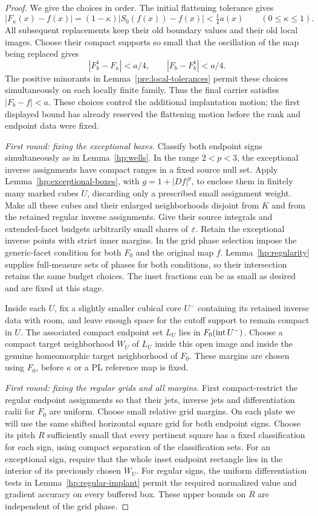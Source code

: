\begin{proof}
We give the choices in order.  The initial flattening tolerance gives
\[
 |F_\kappa(x)-f(x)|
   =(1-\kappa)|S_0(f(x))-f(x)|<\tfrac14a(x)
       \qquad(0\leq\kappa\leq1).
\]
All subsequent replacements keep their old boundary values and their
old local images.  Choose their compact supports so small that the
oscillation of the map being replaced gives
\[
 |F_b^1-F_\kappa|<a/4,
 \qquad |F_b-F_b^1|<a/4.
\]
The positive minorants in Lemma~\ref{pre:local-tolerances} permit these
choices simultaneously on each locally finite family.  Thus the final
carrier satisfies $|F_b-f|<a$.  These choices control the additional
implantation motion; the first displayed bound has already reserved
the flattening motion before the rank and endpoint data were fixed.

\emph{First round: fixing the exceptional boxes.}
Classify both endpoint signs simultaneously as in
Lemma~\ref{hp:wells}.  In the range $2<p<3$, the exceptional inverse
assignments have compact ranges in a fixed source null set.  Apply
Lemma~\ref{hp:exceptional-boxes}, with $g=1+|Df|^p$, to enclose them
in finitely many marked cubes $U$, discarding only a prescribed
small assignment weight.  Make all these cubes and their enlarged
neighborhoods disjoint from $K$ and from the retained regular inverse
assignments.  Give their source integrals and extended-facet budgets
arbitrarily small shares of $\varepsilon$.  Retain the exceptional inverse
points with strict inner margins.  In the grid phase selection impose
the generic-facet condition for both $F_0$ and the original map $f$.
Lemma~\ref{hp:regularity} supplies full-measure sets of phases for
both conditions, so their intersection retains the same budget choices.
The inset fractions can be as small as desired and are fixed at this
stage.

Inside each $U$, fix a slightly smaller cubical core $U^-$ containing
its retained inverse data with room, and leave enough space for the
cutoff support to remain compact in $U$.  The associated compact
endpoint set $L_U$ lies in $F_0(\operatorname{int} U^-)$.  Choose a compact
target neighborhood $W_U$ of $L_U$ inside this open image and inside
the genuine homeomorphic target neighborhood of $F_0$.  These margins
are chosen using $F_0$, before $\kappa$ or a PL reference map is fixed.

\emph{First round: fixing the regular grids and all margins.}
First compact-restrict the regular endpoint assignments so that their
jets, inverse jets and differentiation radii for $F_0$ are uniform.
Choose small relative grid margins.  On each plate we will use the
same shifted horizontal square grid for both endpoint signs.  Choose
its pitch $R$ sufficiently small that every pertinent square has a
fixed classification for each sign, using compact separation of the
classification sets.  For an exceptional sign, require that the whole
inset endpoint rectangle lies in the interior of its previously
chosen $W_U$.  For regular signs, the uniform differentiation tests
in Lemma~\ref{hp:regular-implant} permit the required normalized value
and gradient accuracy on every buffered box.  These upper bounds on
$R$ are independent of the grid phase.


\end{proof}
